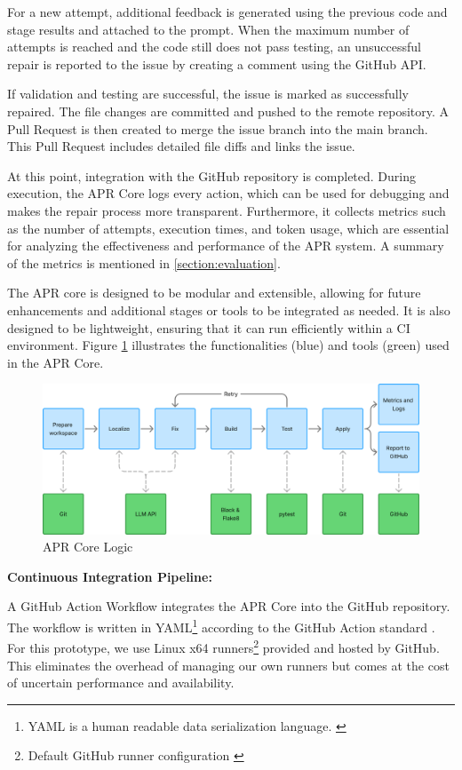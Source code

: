 For a new attempt, additional feedback is generated using the previous code and stage results and attached to the prompt. When the maximum number of attempts is reached and the code still does not pass testing, an unsuccessful repair is reported to the issue by creating a comment using the GitHub API.

If validation and testing are successful, the issue is marked as successfully repaired. The file changes are committed and pushed to the remote repository. A Pull Request is then created to merge the issue branch into the main branch. This Pull Request includes detailed file diffs and links the issue.

At this point, integration with the GitHub repository is completed. During execution, the APR Core logs every action, which can be used for debugging and makes the repair process more transparent. Furthermore, it collects metrics such as the number of attempts, execution times, and token usage, which are essential for analyzing the effectiveness and performance of the APR system. A summary of the metrics is mentioned in \ref{section:evaluation}.

The APR core is designed to be modular and extensible, allowing for future enhancements and additional stages or tools to be integrated as needed. It is also designed to be lightweight, ensuring that it can run efficiently within a CI environment. Figure \ref{fig:apr-core} illustrates the functionalities (blue) and tools (green) used in the APR Core.

\begin{figure}[H]
    \centering
    \includegraphics[width=1\textwidth]{images/flowcharts/apr_core.png}
    \caption{APR Core Logic}
    \label{fig:apr-core}
\end{figure}

\textbf{Continuous Integration Pipeline:}

A GitHub Action Workflow integrates the APR Core into the GitHub repository. The workflow is written in YAML\footnote{YAML is a human readable data serialization language. \cite{OfficialYAMLWeb}} according to the GitHub Action standard \cite{WorkflowSyntaxGitHub}. For this prototype, we use Linux x64 runners\footnote{Default GitHub runner configuration \cite{}} provided and hosted by GitHub. This eliminates the overhead of managing our own runners but comes at the cost of uncertain performance and availability. %


